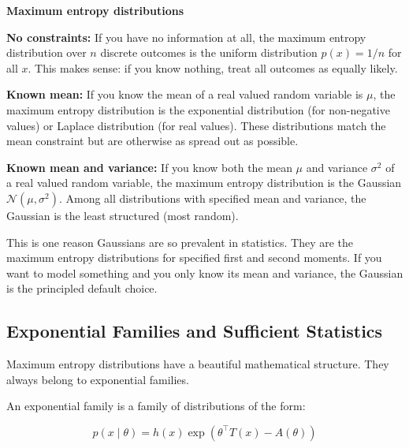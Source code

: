\begin{examplebox}
\textbf{Maximum entropy distributions}

\vspace{0.5em}

\textbf{No constraints:} If you have no information at all, the maximum entropy distribution over $n$ discrete outcomes is the uniform distribution $p(x) = 1/n$ for all $x$. This makes sense: if you know nothing, treat all outcomes as equally likely.

\vspace{0.5em}

\textbf{Known mean:} If you know the mean of a real valued random variable is $\mu$, the maximum entropy distribution is the exponential distribution (for non-negative values) or Laplace distribution (for real values). These distributions match the mean constraint but are otherwise as spread out as possible.

\vspace{0.5em}

\textbf{Known mean and variance:} If you know both the mean $\mu$ and variance $\sigma^2$ of a real valued random variable, the maximum entropy distribution is the Gaussian $\mathcal{N}(\mu, \sigma^2)$. Among all distributions with specified mean and variance, the Gaussian is the least structured (most random).

\vspace{0.5em}

This is one reason Gaussians are so prevalent in statistics. They are the maximum entropy distributions for specified first and second moments. If you want to model something and you only know its mean and variance, the Gaussian is the principled default choice.
\end{examplebox}

\vspace{1.5em}

\subsection{Exponential Families and Sufficient Statistics}

Maximum entropy distributions have a beautiful mathematical structure. They always belong to exponential families.

An exponential family is a family of distributions of the form:

\begin{equation}
p(x \mid \theta) = h(x) \exp\left(\theta^\top T(x) - A(\theta)\right)
\end{equation}

